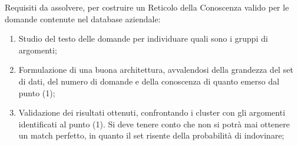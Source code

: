Requisiti da assolvere, per costruire un Reticolo della Conoscenza valido per le domande contenute nel database aziendale:
\begin{enumerate}
\item Studio del testo delle domande per individuare quali sono i gruppi di argomenti;
\item Formulazione di una buona architettura, avvalendosi della grandezza del set di dati, del numero di domande e della conoscenza di quanto emerso dal punto (1);
\item Validazione dei risultati ottenuti, confrontando i cluster con gli argomenti identificati al punto (1). Si deve tenere conto che non si potrà mai ottenere un match perfetto, in quanto il set risente della probabilità di indovinare;
\end{enumerate}


